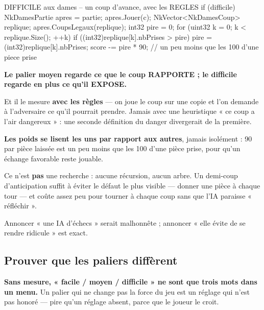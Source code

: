 \begin{nkcode}{DIFFICILE aux dames -- un coup d'avance, avec les REGLES}
if (difficile) {
    NkDamesPartie apres = partie;
    apres.Jouer(c);
    NkVector<NkDamesCoup> replique;
    apres.CoupsLegaux(replique);
    int32 pire = 0;
    for (uint32 k = 0; k < replique.Size(); ++k) {
        if ((int32)replique[k].nbPrises > pire) { pire = (int32)replique[k].nbPrises; }
    }
    score -= pire * 90;   // un peu moins que les 100 d'une piece prise
}
\end{nkcode}

\begin{nkretenir}
\textbf{Le palier moyen regarde ce que le coup RAPPORTE ; le difficile regarde
en plus ce qu'il EXPOSE.}

Et il le mesure \textbf{avec les règles} --- on joue le coup sur une copie et l'on
demande à l'adversaire ce qu'il pourrait prendre. Jamais avec une heuristique
« ce coup a l'air dangereux » : une seconde définition du danger divergerait de
la première.

\textbf{Les poids se lisent les uns par rapport aux autres}, jamais isolément :
90 par pièce laissée est un peu moins que les 100 d'une pièce prise, pour qu'un
échange favorable reste jouable.
\end{nkretenir}

\begin{nkretenir}
Ce n'est \textbf{pas} une recherche : aucune récursion, aucun arbre. Un demi-coup
d'anticipation suffit à éviter le défaut le plus visible --- donner une pièce à
chaque tour --- et coûte assez peu pour tourner à chaque coup sans que l'IA
paraisse « réfléchir ».

Annoncer « une IA d'échecs » serait malhonnête ; annoncer « elle évite de se
rendre ridicule » est exact.
\end{nkretenir}

\subsection{Prouver que les paliers diffèrent}

\begin{nkpiege}
\textbf{Sans mesure, « facile / moyen / difficile » ne sont que trois mots dans
un menu.} Un palier qui ne change pas la force du jeu est un réglage qui n'est
pas honoré --- pire qu'un réglage absent, parce que le joueur le croit.
\end{nkpiege}

